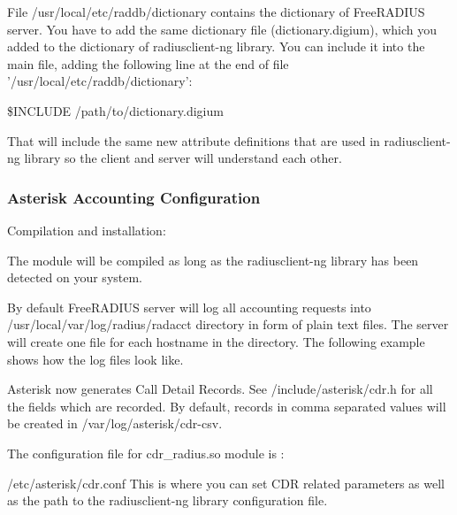 	File /usr/local/etc/raddb/dictionary contains the dictionary of 
	FreeRADIUS server. You have to add the same dictionary file 
	(dictionary.digium), which you added to the dictionary of radiusclient-ng
	library. You can include it into the main file, adding the following line at the
	end of file '/usr/local/etc/raddb/dictionary':
		
	\$INCLUDE /path/to/dictionary.digium

	That will include the same new attribute definitions that are used 
	in radiusclient-ng library so the client and server will understand each 
	other. 


\subsubsection{Asterisk Accounting Configuration}

	Compilation and installation:

        The module will be compiled as long as the radiusclient-ng
        library has been detected on your system.
	
	By default FreeRADIUS server will log all accounting requests into 
	/usr/local/var/log/radius/radacct directory in form of plain text files. 
	The server will create one file for each hostname in the directory. The 
	following example shows how the log files look like. 

	Asterisk now generates Call Detail Records. See /include/asterisk/cdr.h
	for all the fields which are recorded. By default, records in comma 
	separated values will be created in /var/log/asterisk/cdr-csv. 

	The configuration file for cdr\_radius.so module is :

        /etc/asterisk/cdr.conf 
	This is where you can set CDR related parameters as well as the path to
	the radiusclient-ng library configuration file.


